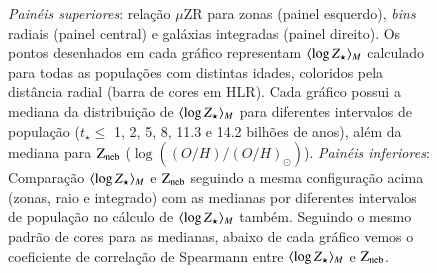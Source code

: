 \begin{figure}
	\centering
	\caption[Relação $\mu$ZR e comparação entre as metalicidades.]
	{\emph{Painéis superiores}: relação $\mu$ZR para zonas (painel esquerdo), {\em bins} radiais
(painel central) e galáxias integradas (painel direito). Os pontos desenhados em cada gráfico
representam $\meanM{\log Z_\star}$ calculado para todas as populações com distintas idades,
coloridos pela distância radial (barra de cores em HLR). Cada gráfico possui a mediana da
distribuição de $\meanM{\log Z_\star}$ para diferentes intervalos de população ($t_\star \leq$ 1,
2, 5, 8, 11.3 e 14.2 bilhões de anos), além da mediana para $\mathrm{Z}_{\mathrm{neb}}$
($\log\left((O/H)/(O/H)_\odot\right)$). \emph{Painéis inferiores}: Comparação $\meanM{\log Z_\star}$
e $\mathrm{Z}_{\mathrm{neb}}$ seguindo a mesma configuração acima (zonas, raio e integrado) com as medianas por diferentes
intervalos de população no cálculo de $\meanM{\log Z_\star}$ também. Seguindo o mesmo padrão de
cores para as medianas, abaixo de cada gráfico vemos o coeficiente de correlação de Spearmann entre
$\meanM{\log Z_\star}$ e $\mathrm{Z}_{\mathrm{neb}}$.}
	\label{fig:ZstarvsZneb}
\end{figure}




